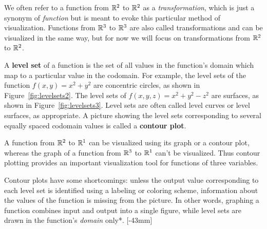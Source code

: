 \documentclass{watsonbook}
\begin{document}
We often refer to a function from $\mathbb{R}^2$ to $\mathbb{R}^2$ as a
\textit{transformation}, which is just a synonym of \textit{function}
but is meant to evoke this particular method of
visualization. Functions from $\mathbb{R}^3$ to $\mathbb{R}^3$ are also called
transformations and can be visualized in the same way, but for now we
will focus on transformations from $\mathbb{R}^2$ to $\mathbb{R}^2$.

A \textbf{level set} of a function is the set of all values in the
function's domain which map to a particular value in the codomain. For
example, the level sets of the function $f(x,y) = x^2 + y^2$ are
concentric circles, as shown in Figure~\ref{fig:levelsets2}. The level
sets of $f(x,y,z) = x^2 + y^2 - z^2$ are surfaces, as shown in
Figure~\ref{fig:levelsets3}. Level sets are often called level curves
or level surfaces, as appropriate. A picture showing the level sets
corresponding to several equally spaced codomain values is called a
\textbf{contour plot}.

A function from $\mathbb{R}^2$ to $\mathbb{R}^1$ can be visualized using its graph or
a contour plot, whereas the graph of a function from $\mathbb{R}^3$ to $\mathbb{R}^1$
can't be visualized. Thus contour plotting provides an important
visualization tool for functions of three variables.

Contour plots have some shortcomings: unless the output value
corresponding to each level set is identified using a labeling or
coloring scheme, information about the values of the function is
missing from the picture. In other words, graphing a function combines
input and output into a single figure, while level sets are drawn in
the function's \textit{domain} only*. [-43mm]
\end{document}
